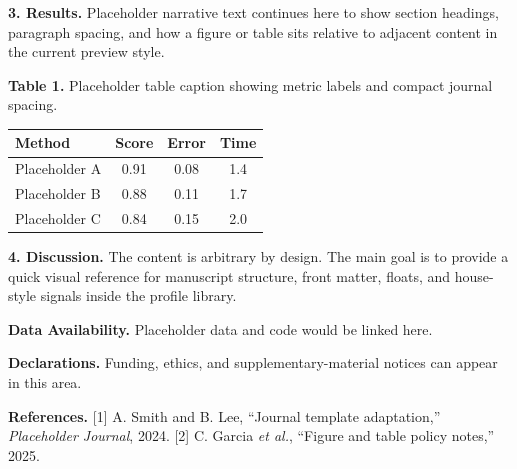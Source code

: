 \documentclass[10pt,a4paper]{article}
\begin{document}
\textbf{3. Results.} Placeholder narrative text continues here to show section headings, paragraph spacing, and how a figure or table sits relative to adjacent content in the current preview style.

\noindent\textbf{Table 1.} Placeholder table caption showing metric labels and compact journal spacing.\par\begin{center}
\begin{tabular}{lccc}
\toprule
Method & Score & Error & Time\\
\midrule
Placeholder A & 0.91 & 0.08 & 1.4\\
Placeholder B & 0.88 & 0.11 & 1.7\\
Placeholder C & 0.84 & 0.15 & 2.0\\
\bottomrule
\end{tabular}\end{center}\vspace{0.5em}

\textbf{4. Discussion.} The content is arbitrary by design. The main goal is to provide a quick visual reference for manuscript structure, front matter, floats, and house-style signals inside the profile library.


\noindent \textbf{Data Availability.} Placeholder data and code would be linked here.\par
\noindent \textbf{Declarations.} Funding, ethics, and supplementary-material notices can appear in this area.\par
\vspace{0.5em}
\noindent \textbf{References.} [1] A. Smith and B. Lee, ``Journal template adaptation,'' \textit{Placeholder Journal}, 2024. [2] C. Garcia \textit{et al.}, ``Figure and table policy notes,'' 2025.\par
\vspace{0.6em}
\end{document}
